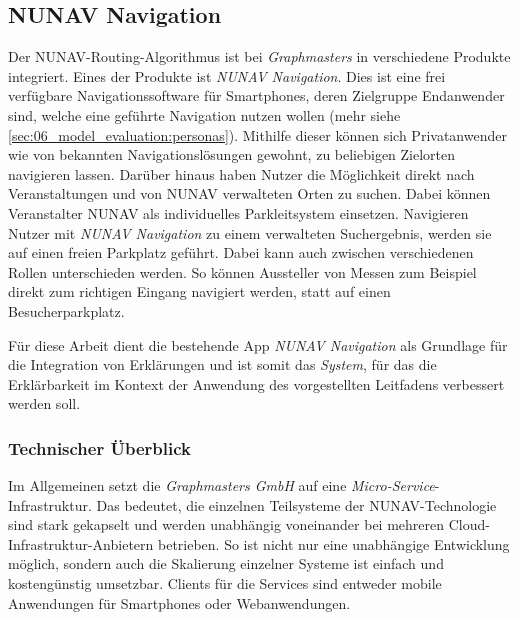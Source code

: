 \subsection{NUNAV Navigation}

Der NUNAV-Routing-Algorithmus ist bei \textit{Graphmasters} in verschiedene Produkte integriert. Eines der Produkte ist \textit{NUNAV Navigation}. Dies ist eine frei verfügbare Navigationssoftware für Smartphones, deren Zielgruppe Endanwender sind, welche eine geführte Navigation nutzen wollen (mehr siehe \autoref{sec:06_model_evaluation:personas}). Mithilfe dieser können sich Privatanwender wie von bekannten Navigationslösungen gewohnt, zu beliebigen Zielorten navigieren lassen. Darüber hinaus haben Nutzer die Möglichkeit direkt nach Veranstaltungen und von NUNAV verwalteten Orten zu suchen. Dabei können Veranstalter NUNAV als individuelles Parkleitsystem einsetzen. Navigieren Nutzer mit \textit{NUNAV Navigation} zu einem verwalteten Suchergebnis, werden sie auf einen freien Parkplatz geführt. Dabei kann auch zwischen verschiedenen Rollen unterschieden werden. So können Aussteller von Messen zum Beispiel direkt zum richtigen Eingang navigiert werden, statt auf einen Besucherparkplatz.

Für diese Arbeit dient die bestehende App \textit{NUNAV Navigation} als Grundlage für die Integration von Erklärungen und ist somit das \textit{System}, für das die Erklärbarkeit im Kontext der Anwendung des vorgestellten Leitfadens verbessert werden soll.

\subsubsection{Technischer Überblick}

Im Allgemeinen setzt die \textit{Graphmasters GmbH} auf eine \textit{Micro-Service}-Infrastruktur. Das bedeutet, die einzelnen Teilsysteme der NUNAV-Technologie sind stark gekapselt und werden unabhängig voneinander bei mehreren Cloud-Infrastruktur-Anbietern betrieben. So ist nicht nur eine unabhängige Entwicklung möglich, sondern auch die Skalierung einzelner Systeme ist einfach und kostengünstig umsetzbar. Clients für die Services sind entweder mobile Anwendungen für Smartphones oder Webanwendungen.

